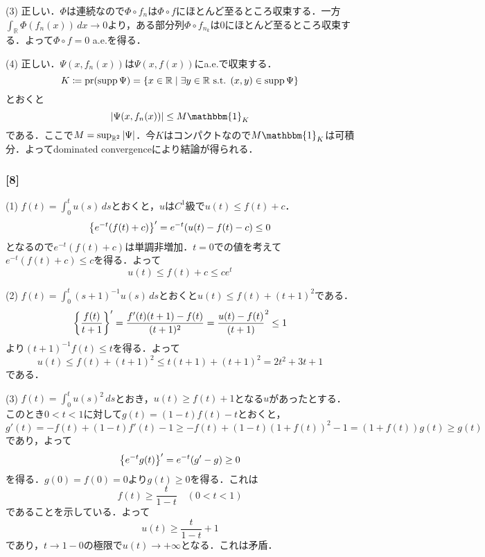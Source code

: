 \documentclass[a4j]{ltjsarticle}
\newcommand{\Rset}{\mathbb{R}}
\newcommand{\1}{\mathbbm{1}}
\DeclareMathOperator*{\supp}{\mathrm{supp}}
\numberwithin{equation}{section}
\theoremstyle{definition}
\begin{document}
(3) 正しい．$\Phi$は連続なので$\Phi\circ f_n$は$\Phi\circ f$にほとんど至るところ収束する．一方$\int_{\Rset}\Phi(f_n(x))\,dx\to0$より，ある部分列$\Phi\circ f_{n_k}$は0にほとんど至るところ収束する．よって$\Phi\circ f=0$ a.e.を得る．

(4) 正しい．$\Psi(x,f_n(x))$は$\Psi(x,f(x))$にa.e.で収束する．
\begin{equation}
    K\coloneq \mathop{\mathrm{pr}}(\supp\Psi)=\qty{x\in\Rset\mid \exists y\in\Rset \text{ s.t. }(x,y)\in \supp\Psi}
\end{equation}
とおくと
\begin{equation}
    \abs{\Psi(x,f_n(x))}\leq M\1_{K}
\end{equation}
である．ここで$M=\sup_{\Rset^2}\abs{\Psi}$．今$K$はコンパクトなので$M\1_{K}$は可積分．よってdominated convergenceにより結論が得られる．

\subsubsection*{[8]}
(1) $f(t)=\int_{0}^{t}u(s)\,ds$とおくと，$u$は$C^1$級で$u(t)\leq f(t)+c$．
\begin{equation}
    \qty{e^{-t}(f(t)+c)}'=e^{-t}\qty(u(t)-f(t)-c)\leq 0
\end{equation}
となるので$e^{-t}(f(t)+c)$は単調非増加．$t=0$での値を考えて$e^{-t}(f(t)+c)\leq c$を得る．よって
\begin{equation}
    u(t)\leq f(t)+c\leq ce^t 
\end{equation}

(2) $f(t)=\int_{0}^t(s+1)^{-1}u(s)\,ds$とおくと$u(t)\leq f(t)+(t+1)^2$である．
\begin{equation}
    \qty{\frac{f(t)}{t+1}}'=\frac{f'(t)(t+1)-f(t)}{(t+1)^2}=\frac{u(t)-f(t)}{(t+1)}^2\leq 1 
\end{equation}
より$(t+1)^{-1}f(t)\leq t$を得る．よって
\begin{equation}
    u(t)\leq f(t)+(t+1)^2\leq t(t+1)+(t+1)^2=2t^2+3t+1
\end{equation}
である．

(3) $f(t)=\int_{0}^tu(s)^2\,ds$とおき，$u(t)\geq f(t)+1$となる$u$があったとする．このとき$0<t<1$に対して$g(t)=(1-t)f(t)-t$とおくと，
\begin{equation}
    g'(t)=-f(t)+(1-t)f'(t)-1\geq -f(t)+(1-t)(1+f(t))^2-1=(1+f(t))g(t)\geq g(t)
\end{equation}
であり，よって
\begin{equation}
    \qty{e^{-t}g(t)}'=e^{-t}(g'-g)\geq0 
\end{equation}
を得る．$g(0)=f(0)=0$より$g(t)\geq 0$を得る．これは
\begin{equation}
    f(t)\geq \frac{t}{1-t}\quad (0<t<1)
\end{equation}
であることを示している．よって
\begin{equation}
    u(t)\geq \frac{t}{1-t}+1
\end{equation}
であり，$t\to1-0$の極限で$u(t)\to+\infty$となる．これは矛盾．
\end{document}
